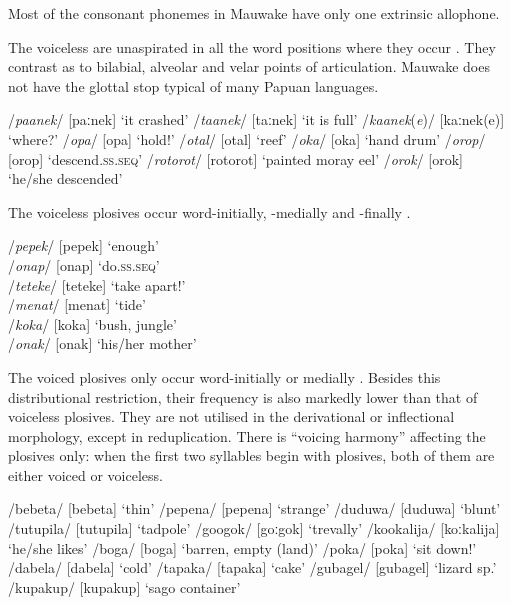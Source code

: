 Most of the consonant phonemes in Mauwake have only one extrinsic allophone. 

The voiceless  are unaspirated in all the word positions where they occur . They contrast as to bilabial, alveolar and velar points of articulation. Mauwake does not have the glottal stop typical of many Papuan languages. 

\ea\label{ex:2:voicelessplosives}
\ea
/\textit{paanek}/  [{{\textprimstress}paːnek}]  `it crashed'
\ex
/\textit{taanek}/  [{{\textprimstress}taːnek}]  `it is full'
\ex
/\textit{kaanek}(\textit{e})/  [{{\textprimstress}kaːnek(e)}]  `where?'
\ex
/\textit{opa}/  [o{{\textprimstress}pa}]  `hold!'
\ex
/\textit{otal}/  [o{{\textprimstress}tal}]  `reef'
\ex
/\textit{oka}/  [o{{\textprimstress}ka}]  `hand drum'
\ex
/\textit{orop}/  [o{{\textprimstress}rop}]  `descend.\textsc{ss.seq}'
\ex
/\textit{rotorot}/  [ro{{\textprimstress}torot}]  `painted moray eel'
\ex
/\textit{orok}/  [o{{\textprimstress}rok}]  `he/she descended'
\z
\z


The voiceless plosives occur word-initially, -medially and -finally .

\ea\label{ex:2:positionofvoicelessplosives}
\ea
/\textit{pepek}/    [pe{{\textprimstress}pek}]    `enough'\\
\ex
/\textit{onap}/    [o{{\textprimstress}nap}]    `do.\textsc{ss.seq}'\\
\ex
/\textit{teteke}/   [te{{\textprimstress}teke}]    `take apart!'\\
\ex
/\textit{menat}/    [me{{\textprimstress}nat}]    `tide'\\
\ex
/\textit{koka}/    [ko{{\textprimstress}ka}]   `bush, jungle'\\
\ex
/\textit{onak}/    [o{{\textprimstress}nak}]   `his/her mother' \\
\z
\z

The voiced plosives only occur word-initially or medially . Besides this distributional restriction, their frequency is also markedly lower than that of voiceless plosives. They are not utilised in the derivational or inflectional morphology, except in reduplication. There is ``voicing harmony'' affecting the plosives only: when the first two syllables begin with plosives, both of them are either voiced or voiceless. 


\ea
\label{tab:2:voicedplosives}
\ea
/bebeta/  [be{{\textprimstress}beta}]  `thin'
\ex
/pepena/  [pe{{\textprimstress}pena}]  `strange'
\ex
/duduwa/  [du{{\textprimstress}duwa}]  `blunt'
\ex
/tutupila/  [tu{{\textprimstress}tupila}]  `tadpole'
\ex
/googok/  [{{\textprimstress}goːgok}]  `trevally'
\ex
/kookalija/  [{{\textprimstress}koːkalija}]  `he/she likes'
\ex
/boga/  [bo{{\textprimstress}ga}]  `barren, empty (land)'
\ex
/poka/  [po{{\textprimstress}ka}]  `sit down!'
\ex
/dabela/  [da{{\textprimstress}bela}]  `cold'
\ex
/tapaka/  [ta{{\textprimstress}paka}]  `cake'
\ex
/gubagel/  [gu{{\textprimstress}bagel}]  `lizard sp.' 
\ex
/kupakup/  [ku{{\textprimstress}pakup}]  `sago container'
\z
\z

